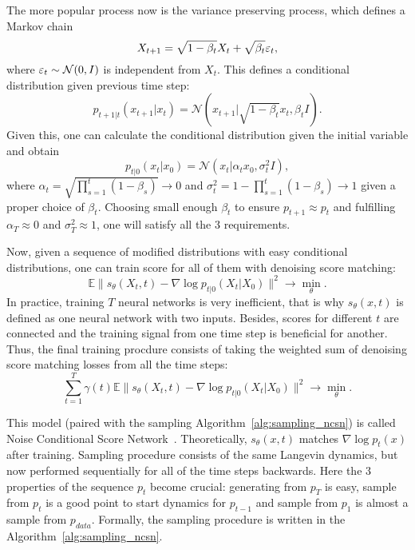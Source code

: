 The more popular process now is the variance preserving process, which defines a Markov chain
\begin{equation}\label{eq:vp_process}
    X_{t + 1} = \sqrt{1 - \beta_t} X_t + \sqrt{\beta_t} \varepsilon_t,    
\end{equation}
where $\varepsilon_t \sim \mathcal{N}(0, I)$ is independent from $X_t$. This defines a conditional distribution given previous time step:
\[
    p_{t + 1 | t}(x_{t + 1} | x_t) = \mathcal{N}(x_{t + 1} | \sqrt{1 - \beta_t} x_t, \beta_t I).
\]
Given this, one can calculate the conditional distribution given the initial variable and obtain~\cite{ho2020denoising}
\[
    p_{t | 0}(x_t | x_0) = \mathcal{N}(x_t | \alpha_t x_0, \sigma^2_t I),
\]
where $\alpha_t = \sqrt{\prod_{s = 1}^{t} (1 - \beta_s)} \rightarrow 0$ and $\sigma^2_t = 1 - \prod_{s = 1}^{t}(1 - \beta_s) \rightarrow 1$ given a proper choice of $\beta_t$. Choosing small enough $\beta_t$ to ensure $p_{t + 1} \approx p_{t}$ and fulfilling $\alpha_T \approx 0$ and $\sigma_T^2 \approx 1$, one will satisfy all the 3 requirements.

Now, given a sequence of modified distributions with easy conditional distributions, one can train score for all of them with denoising score matching:
\[
    \mathbb{E}\|s_\theta(X_t, t) - \nabla \log p_{t | 0}(X_t | X_0) \|^2 \rightarrow \min\limits_{\theta}.
\]
In practice, training $T$ neural networks is very inefficient, that is why $s_\theta(x, t)$ is defined as one neural network with two inputs. Besides, scores for different $t$ are connected and the training signal from one time step is beneficial for another. Thus, the final training procdure consists of taking the weighted sum of denoising score matching losses from all the time steps:
\begin{equation}\label{eq:ncsn_training}
    \sum\limits_{t = 1}^{T} \gamma(t) \mathbb{E}\|s_\theta(X_t, t) - \nabla \log p_{t | 0}(X_t | X_0) \|^2 \rightarrow \min\limits_{\theta}.
\end{equation}

This model (paired with the sampling Algorithm~\ref{alg:sampling_ncsn}) is called Noise Conditional Score Network~\cite{song2019generative}. Theoretically, $s_{\theta}(x, t)$ matches $\nabla \log p_{t}(x)$ after training. Sampling procedure consists of the same Langevin dynamics, but now performed sequentially for all of the time steps backwards. Here the 3 properties of the sequence $p_t$ become crucial: generating from $p_T$ is easy, sample from $p_{t}$ is a good point to start dynamics for $p_{t - 1}$ and sample from $p_{1}$ is almost a sample from $p_{data}$. Formally, the sampling procedure is written in the Algorithm~\ref{alg:sampling_ncsn}.

